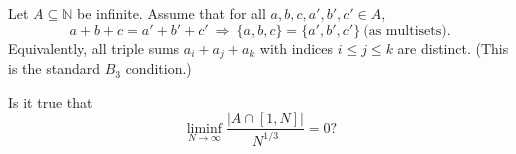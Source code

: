 Let $A\subseteq\mathbb N$ be infinite.  Assume that for all $a,b,c,a',b',c'\in A$,
\[
 a+b+c=a'+b'+c'\ \Longrightarrow\ \{a,b,c\}=\{a',b',c'\}\ \text{(as multisets)}.
\]
Equivalently, all triple sums $a_i+a_j+a_k$ with indices $i\le j\le k$ are distinct.  (This is the standard $B_3$ condition.)

Is it true that
\[
\liminf_{N\to\infty}\frac{|A\cap[1,N]|}{N^{1/3}}=0?
\]
